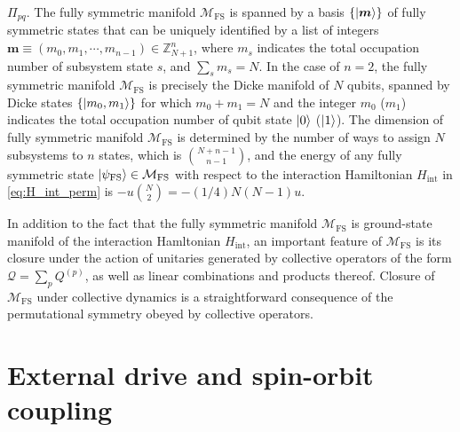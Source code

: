 \documentclass[nofootinbib,notitlepage,11pt]{revtex4-2}
\renewcommand{\t}{\text} %
\newcommand{\p}[1]{\left(#1\right)} %
\renewcommand{\set}[1]{\left\{#1\right\}} %
\renewcommand{\v}{\bm} %
\newcommand{\1}{\mathds{1}}
\newcommand{\M}{\mathcal{M}}
\newcommand{\Q}{\mathcal{Q}}
\newcommand{\ZZ}{\mathbb{Z}}
\newcommand{\FS}{\text{FS}}
\begin{document}
$\Pi_{pq}$.  The fully symmetric manifold $\M_\FS$ is spanned by a
basis $\set{\ket{\v m}}$ of fully symmetric states that can be
uniquely identified by a list of integers
$\v m\equiv\p{m_0,m_1,\cdots,m_{n-1}}\in\ZZ_{N+1}^n$, where $m_s$
indicates the total occupation number of subsystem state $s$, and
$\sum_sm_s=N$.  In the case of $n=2$, the fully symmetric manifold
$\M_\FS$ is precisely the Dicke manifold\cite{dicke1954coherence} of
$N$ qubits, spanned by Dicke states $\set{\ket{m_0,m_1}}$ for which
$m_0+m_1=N$ and the integer $m_0$ ($m_1$) indicates the total
occupation number of qubit state $\ket{0}$ ($\ket{1}$).  The dimension
of fully symmetric manifold $\M_\FS$ is determined by the number of
ways to assign $N$ subsystems to $n$ states, which is
${N+n-1 \choose n-1}$, and the energy of any fully symmetric state
$\ket{\psi_\FS}\in\M_\FS$ with respect to the interaction Hamiltonian
$H_{\t{int}}$ in \eqref{eq:H_int_perm} is
$-u{N \choose 2}=-\p{1/4}N\p{N-1}u$.

In addition to the fact that the fully symmetric manifold $\M_\FS$ is
ground-state manifold of the interaction Hamltonian $H_{\t{int}}$, an
important feature of $\M_\FS$ is its closure under the action of
unitaries generated by collective operators of the form
$\Q=\sum_pQ^{(p)}$, as well as linear combinations and products
thereof.  Closure of $\M_\FS$ under collective dynamics is a
straightforward consequence of the permutational symmetry obeyed by
collective operators.

\section{External drive and spin-orbit coupling}
\label{sec:drive_SOC}
\end{document}
